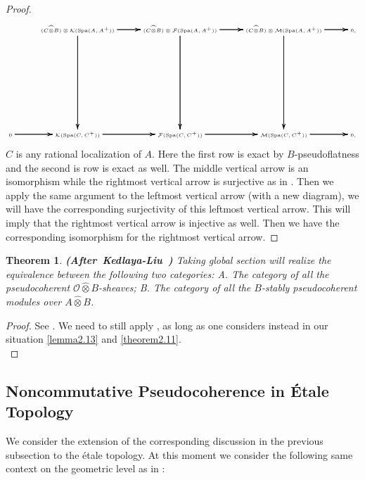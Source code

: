 \documentclass[12pt]{amsart}
\newtheorem{theorem}{Theorem}[section]
\theoremstyle{definition}
\numberwithin{equation}{section}
\begin{document}
\begin{proof}
\[ \tiny
\xymatrix@C+0pc@R+6pc{
 &(C\widehat{\otimes}B)\otimes\mathcal{K}(\mathrm{Spa}(A,A^+))   \ar[r]\ar[r]\ar[r] \ar[d]\ar[d]\ar[d] &(C\widehat{\otimes}B)\otimes\mathcal{F}(\mathrm{Spa}(A,A^+)) \ar[r]\ar[r]\ar[r] \ar[d]\ar[d]\ar[d] & (C\widehat{\otimes}B)\otimes\mathcal{M}(\mathrm{Spa}(A,A^+))\ar[r]\ar[r]\ar[r]  \ar[d]\ar[d]\ar[d]&0,\\
0 \ar[r]\ar[r]\ar[r] &\mathcal{K}(\mathrm{Spa}(C,C^+))   \ar[r]\ar[r]\ar[r] &\mathcal{F}(\mathrm{Spa}(C,C^+)) \ar[r]\ar[r]\ar[r] & \mathcal{M}(\mathrm{Spa}(C,C^+)) \ar[r]\ar[r]\ar[r] &0,\\
}
\]
$C$ is any rational localization of $A$. Here the first row is exact by $B$-pseudoflatness and the second is row is exact as well. The middle vertical arrow is an isomorphism while the rightmost vertical arrow is surjective as in \cite[Lemma 2.5.4]{KL2}. Then we apply the same argument to the leftmost vertical arrow (with a new diagram), we will have the corresponding surjectivity of this leftmost vertical arrow. This will imply that the rightmost vertical arrow is injective as well. Then we have the corresponding isomorphism for the rightmost vertical arrow.
\end{proof}




\begin{theorem}\mbox{\bf{(After Kedlaya-Liu \cite[Theorem 2.5.5]{KL2})}} \label{theorem2.14}
Taking global section will realize the equivalence between the following two categories: A. The category of all the pseudocoherent $\mathcal{O}\widehat{\otimes}B$-sheaves; B. The category of all the $B$-stably pseudocoherent modules over $A\widehat{\otimes}B$. 	
\end{theorem}


\begin{proof}
See \cite[Theorem 2.5.5]{KL2}. We need to still apply \cite[Proposition 2.4.20]{KL1}, as long as one considers instead in our situation \cref{lemma2.13} and \cref{theorem2.11}.\\	
\end{proof}






\subsection{Noncommutative Pseudocoherence in \'Etale Topology}

\indent We consider the extension of the corresponding discussion in the previous subsection to the \'etale topology. At this moment we consider the following same context on the geometric level as in \cite{KL2}:
\end{document}

